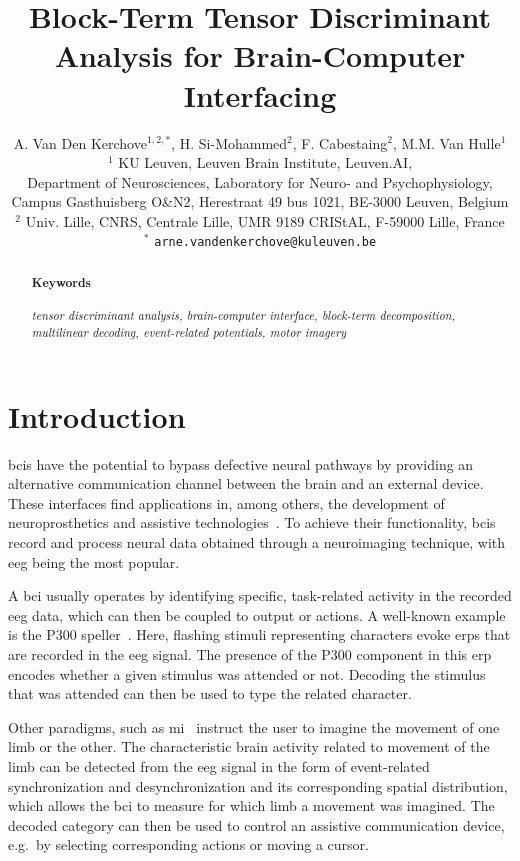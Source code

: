 \documentclass[twocolumn]{article}
\title{Block-Term Tensor Discriminant Analysis for Brain-Computer Interfacing}
\author{%
	A. Van Den Kerchove$^{1,2,*}$,
	H. Si-Mohammed$^{2}$,
	F. Cabestaing$^{2}$,
	M.M. Van Hulle$^{1}$
	\bigskip\\
	$^1$ KU Leuven,
	Leuven Brain Institute,
	Leuven.AI,\\
	Department of Neurosciences,
	Laboratory for Neuro- and Psychophysiology,
	\\
	Campus Gasthuisberg O\&N2,
	Herestraat 49 bus 1021,
	BE-3000 Leuven,
	Belgium
	\smallskip\\
	$^2$ Univ. Lille, CNRS, Centrale Lille,
	UMR 9189 CRIStAL,
	F-59000 Lille,
	France
	\smallskip\\
	$^*$ \texttt{arne.vandenkerchove@kuleuven.be}
}
\begin{document}
\maketitle

\begin{abstract}
	

	\paragraph{Keywords}
	\emph{%
		tensor discriminant analysis,
		brain-computer interface,
		block-term decomposition,
		multilinear decoding,
		event-related potentials,
		motor imagery
	}
\end{abstract}

\section{Introduction}

\Acp{bci} have the potential to bypass
defective neural pathways by providing an alternative communication channel
between the brain and an external device.
These interfaces find applications in, among others, the development of neuroprosthetics and assistive
technologies~\cite{Wolpaw2020}.
To achieve their functionality, \acp{bci} record and process neural data obtained through
a neuroimaging technique, with \ac{eeg} being the most popular.

A \ac{bci} usually operates by identifying specific, task-related activity in
the recorded \ac{eeg} data, which can then be coupled to output or actions.
A well-known example is the P300 speller~\cite{Krusienski2006}.
Here, flashing stimuli representing characters evoke \acp{erp} that are recorded in the
\ac{eeg} signal.
The presence of the P300 component in this \ac{erp} encodes whether a given
stimulus was attended or not.
Decoding the stimulus that was attended can then be used to type the related
character.

Other paradigms, such as \ac{mi}~\cite{Aggarwal2019} instruct the user to imagine the movement of
one limb or the other.
The characteristic brain activity related to movement of the limb can be
detected from the \ac{eeg} signal in the form of event-related synchronization
and desynchronization and its corresponding spatial distribution,
which allows the \ac{bci} to measure for which limb a movement was
imagined.
The decoded category can then be used to control an assistive communication
device,
e.g.\ by selecting corresponding actions or moving a cursor.
\end{document}
